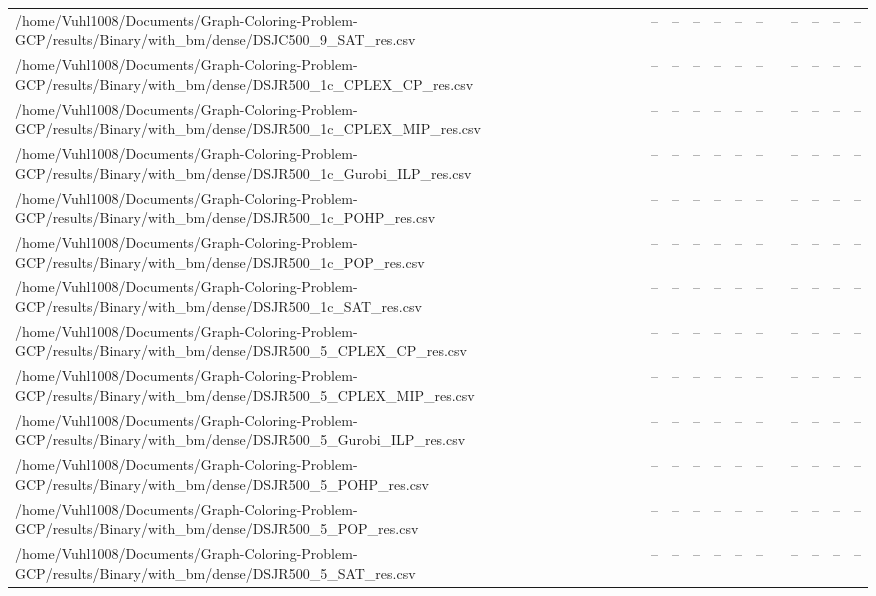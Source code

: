 \begin{table}[htbp]
\begin{tabular}{llllllllllll}
/home/Vuhl1008/Documents/Graph-Coloring-Problem-GCP/results/Binary/with\_bm/dense/DSJC500\_9\_SAT\_res.csv & -- & -- & -- & -- & -- & -- & {} & -- & -- & -- & -- \\
/home/Vuhl1008/Documents/Graph-Coloring-Problem-GCP/results/Binary/with\_bm/dense/DSJR500\_1c\_CPLEX\_CP\_res.csv & -- & -- & -- & -- & -- & -- & {} & -- & -- & -- & -- \\
/home/Vuhl1008/Documents/Graph-Coloring-Problem-GCP/results/Binary/with\_bm/dense/DSJR500\_1c\_CPLEX\_MIP\_res.csv & -- & -- & -- & -- & -- & -- & {} & -- & -- & -- & -- \\
/home/Vuhl1008/Documents/Graph-Coloring-Problem-GCP/results/Binary/with\_bm/dense/DSJR500\_1c\_Gurobi\_ILP\_res.csv & -- & -- & -- & -- & -- & -- & {} & -- & -- & -- & -- \\
/home/Vuhl1008/Documents/Graph-Coloring-Problem-GCP/results/Binary/with\_bm/dense/DSJR500\_1c\_POHP\_res.csv & -- & -- & -- & -- & -- & -- & {} & -- & -- & -- & -- \\
/home/Vuhl1008/Documents/Graph-Coloring-Problem-GCP/results/Binary/with\_bm/dense/DSJR500\_1c\_POP\_res.csv & -- & -- & -- & -- & -- & -- & {} & -- & -- & -- & -- \\
/home/Vuhl1008/Documents/Graph-Coloring-Problem-GCP/results/Binary/with\_bm/dense/DSJR500\_1c\_SAT\_res.csv & -- & -- & -- & -- & -- & -- & {} & -- & -- & -- & -- \\
/home/Vuhl1008/Documents/Graph-Coloring-Problem-GCP/results/Binary/with\_bm/dense/DSJR500\_5\_CPLEX\_CP\_res.csv & -- & -- & -- & -- & -- & -- & {} & -- & -- & -- & -- \\
/home/Vuhl1008/Documents/Graph-Coloring-Problem-GCP/results/Binary/with\_bm/dense/DSJR500\_5\_CPLEX\_MIP\_res.csv & -- & -- & -- & -- & -- & -- & {} & -- & -- & -- & -- \\
/home/Vuhl1008/Documents/Graph-Coloring-Problem-GCP/results/Binary/with\_bm/dense/DSJR500\_5\_Gurobi\_ILP\_res.csv & -- & -- & -- & -- & -- & -- & {} & -- & -- & -- & -- \\
/home/Vuhl1008/Documents/Graph-Coloring-Problem-GCP/results/Binary/with\_bm/dense/DSJR500\_5\_POHP\_res.csv & -- & -- & -- & -- & -- & -- & {} & -- & -- & -- & -- \\
/home/Vuhl1008/Documents/Graph-Coloring-Problem-GCP/results/Binary/with\_bm/dense/DSJR500\_5\_POP\_res.csv & -- & -- & -- & -- & -- & -- & {} & -- & -- & -- & -- \\
/home/Vuhl1008/Documents/Graph-Coloring-Problem-GCP/results/Binary/with\_bm/dense/DSJR500\_5\_SAT\_res.csv & -- & -- & -- & -- & -- & -- & {} & -- & -- & -- & -- \\

\end{tabular}
\end{table}
